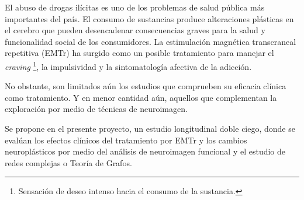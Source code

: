 El abuso de drogas ilícitas es uno de los problemas de salud pública más
importantes del país. El consumo de sustancias produce alteraciones plásticas en el
cerebro que pueden desencadenar consecuencias graves para la salud y funcionalidad
social de los consumidores. La estimulación magnética transcraneal repetitiva
(EMTr) ha surgido como un posible tratamiento para manejar el \textit{craving}
\footnote{Sensación de deseo intenso hacia el consumo de la sustancia.},
la impulsividad y la sintomatología afectiva de la adicción. \par
No obstante, son limitados aún los estudios que comprueben su eficacia clínica
como tratamiento. Y en menor cantidad aún, aquellos que complementan la exploración
 por medio de técnicas de neuroimagen. \par
Se propone en el presente proyecto, un estudio longitudinal
doble ciego, donde se evalúan los efectos clínicos del tratamiento por EMTr y los
cambios neuroplásticos por medio del análisis de neuroimagen funcional y el estudio
de redes complejas o Teoría de Grafos.
